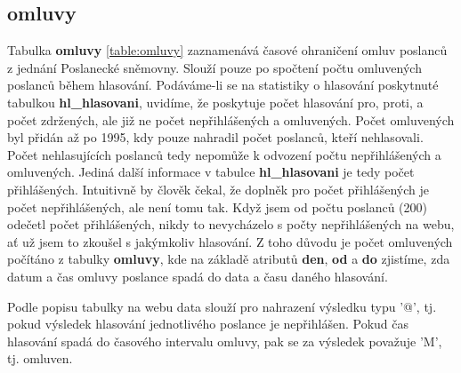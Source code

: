 \subsection*{omluvy}

Tabulka \textbf{omluvy} \ref{table:omluvy} zaznamenává časové ohraničení omluv poslanců z jednání Poslanecké sněmovny. Slouží pouze po spočtení počtu omluvených poslanců během hlasování. Podáváme-li se na statistiky o hlasování poskytnuté tabulkou \textbf{hl\_hlasovani}, uvidíme, že poskytuje počet hlasování pro, proti, a počet zdržených, ale již ne počet nepřihlášených a omluvených. Počet omluvených byl přidán až po 1995, kdy pouze nahradil počet poslanců, kteří nehlasovali. Počet nehlasujících poslanců tedy nepomůže k odvození počtu nepřihlášených a omluvených. Jediná další informace v tabulce \textbf{hl\_hlasovani} je tedy počet přihlášených. Intuitivně by člověk čekal, že doplněk pro počet přihlášených je počet nepřihlášených, ale není tomu tak. Když jsem od počtu poslanců (200) odečetl počet přihlášených, nikdy to nevycházelo s počty nepřihlášených na webu, ať už jsem to zkoušel s jakýmkoliv hlasování. Z toho důvodu je počet omluvených počítáno z tabulky \textbf{omluvy}, kde na základě atributů \textbf{den}, \textbf{od} a \textbf{do} zjistíme, zda datum a čas omluvy poslance spadá do data a času daného hlasování.

Podle popisu tabulky na webu data slouží pro nahrazení výsledku typu '@', tj. pokud výsledek hlasování jednotlivého poslance je nepřihlášen. Pokud čas hlasování spadá do časového intervalu omluvy, pak se za výsledek považuje 'M', tj. omluven.

\newpage

